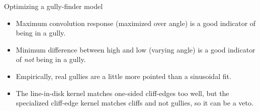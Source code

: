 \documentclass[aspectratio=169]{beamer}
\begin{document}
\begin{frame}{Optimizing a gully-finder model}
\vspace{0.25 cm}
\large
\begin{itemize}\setlength{\itemsep}{0.25 cm}
\item<1-> Maximum convolution response (maximized over angle) is a good indicator of being in a gully.
\item<2-> Minimum difference between high and low (varying angle) is a good indicator of {\it not} being in a gully.
\item<3-> Empirically, real gullies are a little more pointed than a sinusoidal fit.
\item<4-> The line-in-disk kernel matches one-sided cliff-edges too well, but the specialized cliff-edge kernel matches cliffs and not gullies, so it can be a veto.
\end{itemize}

\vspace{0.5 cm}

\vspace{0.5 cm}
\end{frame}
\end{document}
